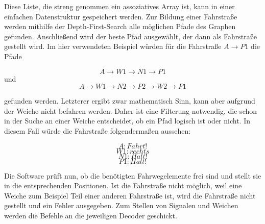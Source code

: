 Diese Liste, die streng genommen ein assoziatives Array ist, kann in einer einfachen Datenstruktur gespeichert werden. Zur Bildung einer Fahrstraße werden mithilfe der Depth-First-Search alle möglichen Pfade des Graphen gefunden. Anschließend wird der beste Pfad ausgewählt, der dann als Fahrstraße gestellt wird. Im hier verwendeten Beispiel würden für die Fahrstraße \(A \rightarrow P1\) die Pfade

\[A \rightarrow W1 \rightarrow N1 \rightarrow P1\] und
\[A \rightarrow W1 \rightarrow N2 \rightarrow P2 \rightarrow W2 \rightarrow P1\]

gefunden werden. Letzterer ergibt zwar mathematisch Sinn, kann aber aufgrund der Weiche nicht befahren werden. Daher ist eine Filterung notwendig, die schon in der Suche an einer Weiche entscheidet, ob ein Pfad logisch ist oder nicht. In diesem Fall würde die Fahrstraße folgendermaßen aussehen:

\[A: Fahrt!\]
\[W1: rechts\]
\[N1: Halt!\]
\[P1: Halt!\]

Die Software prüft nun, ob die benötigten Fahrwegelemente frei sind und stellt sie in die entsprechenden Positionen. Ist die Fahrstraße nicht möglich, weil eine Weiche zum Beispiel Teil einer anderen Fahrstraße ist, wird die Fahrstraße nicht gestellt und ein Fehler ausgegeben. Zum Stellen von Signalen und Weichen werden die Befehle an die jeweiligen Decoder geschickt.

